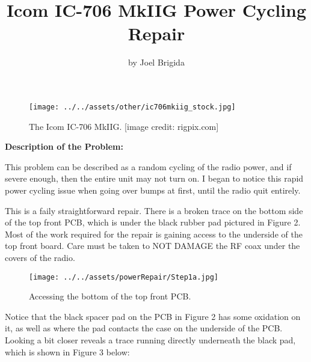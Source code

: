 \documentclass[11pt, letterpaper]{article}
\title{Icom IC-706 MkIIG Power Cycling Repair}
\author{by Joel Brigida}
\date{} %
\begin{document}
\maketitle
\thispagestyle{empty} %

\begin{figure}[H] %
    \centering %
    \texttt{[image: ../../assets/other/ic706mkiig\_stock.jpg]} %
    \caption{The Icom IC-706 MkIIG. [image credit: rigpix.com]} %
\end{figure}

\newpage
\setcounter{page}{1} %

\begin{center}
    \textbf{Description of the Problem:}
\end{center}

\hspace{\parindent}This problem can be described as a random cycling of the radio power, and if severe enough,
then the entire unit may not turn on. I began to notice this rapid power cycling issue when going over bumps
at first, until the radio quit entirely.

\hspace{\parindent}This is a faily straightforward repair. There is a broken trace on the bottom side of the top
front PCB, which is under the black rubber pad pictured in Figure 2. Most of the work required for the repair is 
gaining access to the underside of the top front board. Care must be taken to NOT DAMAGE the RF coax under the
covers of the radio.

\begin{figure}[H] %
    \centering %
    \texttt{[image: ../../assets/powerRepair/Step1a.jpg]} %
    \caption{Accessing the bottom of the top front PCB.} %
\end{figure}

\hspace{\parindent}Notice that the black spacer pad on the PCB in Figure 2 has some oxidation on it, as well as 
where the pad contacts the case on the underside of the PCB. Looking a bit closer reveals a trace running directly 
underneath the black pad, which is shown in Figure 3 below:
\end{document}
